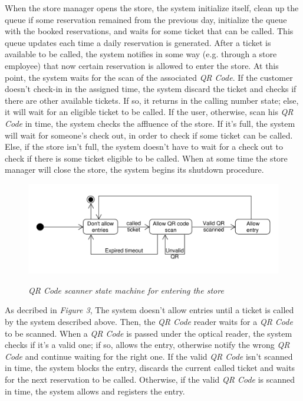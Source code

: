 \documentclass{article}
\begin{document}
		When the store manager opens the store, the system initialize itself, clean up the queue if some reservation remained from the previous day, initialize the queue with the booked reservations, and waits for some ticket that can be called. This queue updates each time a daily reservation is generated. After a ticket is available to be called, the system notifies in some way (e.g. through a store employee) that now certain reservation is allowed to enter the store. At this point, the system waits for the scan of the associated \emph{QR Code}. If the customer doesn't check-in in the assigned time, the system discard the ticket and checks if there are other available tickets. If so, it returns in the calling number state; else, it will wait for an eligible ticket to be called. If the user, otherwise, scan his \emph{QR Code} in time, the system checks the affluence of the store. If it's full, the system will wait for someone's check out, in order to check if some ticket can be called. Else, if the store isn't full, the system doesn't have to wait for a check out to check if there is some ticket eligible to be called. When at some time the store manager will close the store, the system begins its shutdown procedure.
		
		\bigskip
		
		\begin{figure}[!h]
			
			\centering
			\hspace*{-0.0cm}\includegraphics[scale=0.49]{StateCharts/qr_scanner_uml.pdf} \\
			\caption{\emph{QR Code scanner state machine for entering the store}}
			
		\end{figure}
	
		\newpage
		
		As decribed in \emph{Figure 3}, The system doesn't allow entries until a ticket is called by the system described above. Then, the \emph{QR Code} reader waits for a \emph{QR Code} to be scanned. When a \emph{QR Code} is passed under the optical reader, the system checks if it's a valid one; if so, allows the entry, otherwise notify the wrong \emph{QR Code} and continue waiting for the right one. If the valid \emph{QR Code} isn't scanned in time, the system blocks the entry, discards the current called ticket and waits for the next reservation to be called. Otherwise, if the valid \emph{QR Code} is scanned in time, the system allows and registers the entry.
		
\end{document}
